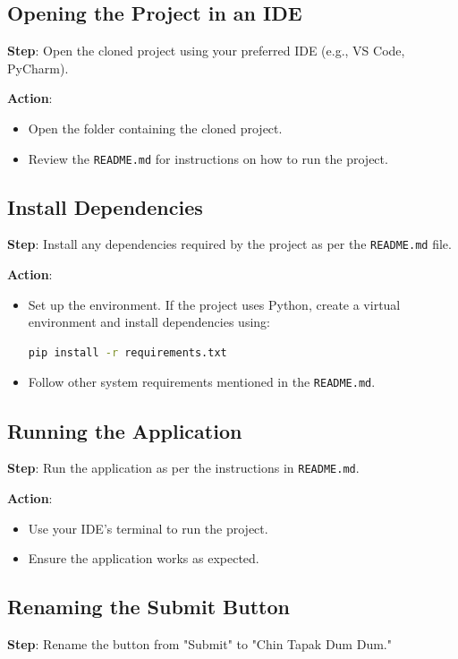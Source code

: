 \documentclass{article}
\begin{document}
\subsection{Opening the Project in an IDE}
\textbf{Step}: Open the cloned project using your preferred IDE (e.g., VS Code, PyCharm).

\textbf{Action}:
\begin{itemize}
    \item Open the folder containing the cloned project.
    \item Review the \texttt{README.md} for instructions on how to run the project.
\end{itemize}

\subsection{Install Dependencies}
\textbf{Step}: Install any dependencies required by the project as per the \texttt{README.md} file.

\textbf{Action}:
\begin{itemize}
    \item Set up the environment. If the project uses Python, create a virtual environment and install dependencies using:
    \begin{lstlisting}[language=bash]
    pip install -r requirements.txt
    \end{lstlisting}
    \item Follow other system requirements mentioned in the \texttt{README.md}.
\end{itemize}

\subsection{Running the Application}
\textbf{Step}: Run the application as per the instructions in \texttt{README.md}.

\textbf{Action}:
\begin{itemize}
    \item Use your IDE's terminal to run the project.
    \item Ensure the application works as expected.
\end{itemize}

\subsection{Renaming the Submit Button}
\textbf{Step}: Rename the button from "Submit" to "Chin Tapak Dum Dum."
\end{document}
